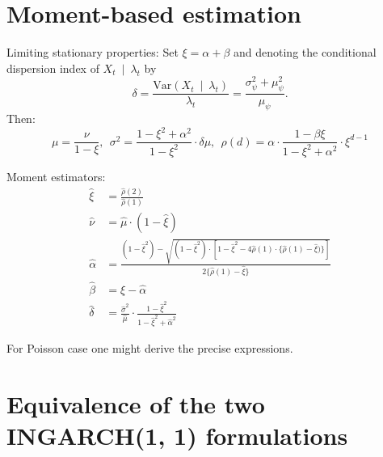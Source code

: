 \documentclass[review]{elsarticle}
\begin{document}
\section{Moment-based estimation}

Limiting stationary properties: Set $\xi = \alpha + \beta$ and denoting the conditional dispersion index of $X_t \ \mid \ \lambda_t$ by
$$
\delta = \frac{\text{Var}(X_t \ \mid \ \lambda_t)}{\lambda_t} = \frac{\sigma^2_\psi + \mu_\psi^2}{\mu_\psi}.
$$
Then:
$$
\mu = \frac{\nu}{1 - \xi}, \ \ \sigma^2 = \frac{1 - \xi^2 + \alpha^2}{1 - \xi^2} \cdot \delta\mu, \ \ \rho(d) = \alpha\cdot \frac{1 - \beta\xi}{1 - \xi^2 + \alpha^2}\cdot \xi^{d - 1}
$$

Moment estimators:
\begin{align*}
\hat{\xi} & = \frac{\hat{\rho}(2)}{\hat{\rho}(1)}\\
\hat{\nu} & = \hat{\mu}\cdot(1 - \hat{\xi})\\
\hat{\alpha} & = \frac{(1 - \hat{\xi}^2) - \sqrt{(1 - \hat{\xi}^2) \cdot [1 - \hat{\xi}^2 - 4\hat\rho(1)\cdot\{\hat\rho(1) - \hat{\xi})\}]}}{2\{\hat\rho(1) - \hat{\xi}\}}\\
\hat{\beta} & = \hat\xi - \hat\alpha\\
\hat{\delta} & = \frac{\hat\sigma^2}{\hat\mu} \cdot \frac{1 - \hat\xi^2}{1 - \hat\xi^2 + \hat\alpha^2}
\end{align*}


For Poisson case one might derive the precise expressions.

\appendix
\section{Equivalence of the two INGARCH(1, 1) formulations}
\label{appendix:proof}
\end{document}
